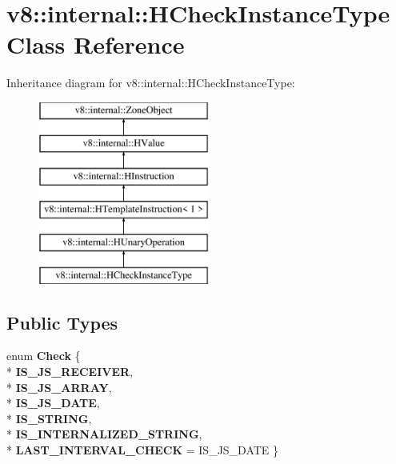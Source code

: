 \hypertarget{classv8_1_1internal_1_1_h_check_instance_type}{}\section{v8\+:\+:internal\+:\+:H\+Check\+Instance\+Type Class Reference}
\label{classv8_1_1internal_1_1_h_check_instance_type}
Inheritance diagram for v8\+:\+:internal\+:\+:H\+Check\+Instance\+Type\+:\begin{figure}[H]
\begin{center}
\leavevmode
\includegraphics[height=6.000000cm]{classv8_1_1internal_1_1_h_check_instance_type}
\end{center}
\end{figure}
\subsection*{Public Types}
\begin{DoxyCompactItemize}
\item 
enum {\bfseries Check} \{ \\*
{\bfseries I\+S\+\_\+\+J\+S\+\_\+\+R\+E\+C\+E\+I\+V\+ER}, 
\\*
{\bfseries I\+S\+\_\+\+J\+S\+\_\+\+A\+R\+R\+AY}, 
\\*
{\bfseries I\+S\+\_\+\+J\+S\+\_\+\+D\+A\+TE}, 
\\*
{\bfseries I\+S\+\_\+\+S\+T\+R\+I\+NG}, 
\\*
{\bfseries I\+S\+\_\+\+I\+N\+T\+E\+R\+N\+A\+L\+I\+Z\+E\+D\+\_\+\+S\+T\+R\+I\+NG}, 
\\*
{\bfseries L\+A\+S\+T\+\_\+\+I\+N\+T\+E\+R\+V\+A\+L\+\_\+\+C\+H\+E\+CK} = I\+S\+\_\+\+J\+S\+\_\+\+D\+A\+TE
 \}\hypertarget{classv8_1_1internal_1_1_h_check_instance_type_aba822b1444d5a80f98cadeb9ed83c85b}{}\label{classv8_1_1internal_1_1_h_check_instance_type_aba822b1444d5a80f98cadeb9ed83c85b}

\end{DoxyCompactItemize}
